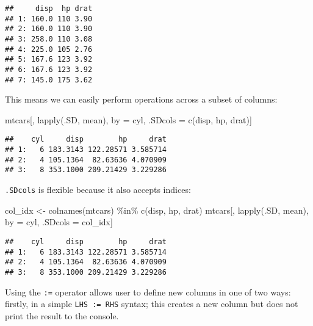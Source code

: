 \documentclass[
]{book}
\newenvironment{Shaded}{\begin{snugshade}}{\end{snugshade}}
\newcommand{\FunctionTok}[1]{\textcolor[rgb]{0.00,0.00,0.00}{#1}}
\newcommand{\NormalTok}[1]{#1}
\newcommand{\OtherTok}[1]{\textcolor[rgb]{0.56,0.35,0.01}{#1}}
\newcommand{\SpecialCharTok}[1]{\textcolor[rgb]{0.00,0.00,0.00}{#1}}
\newcommand{\StringTok}[1]{\textcolor[rgb]{0.31,0.60,0.02}{#1}}
\begin{document}
\begin{verbatim}
##     disp  hp drat
## 1: 160.0 110 3.90
## 2: 160.0 110 3.90
## 3: 258.0 110 3.08
## 4: 225.0 105 2.76
## 5: 167.6 123 3.92
## 6: 167.6 123 3.92
## 7: 145.0 175 3.62
\end{verbatim}

This means we can easily perform operations across a subset of columns:

\begin{Shaded}
\begin{Highlighting}[]
\NormalTok{mtcars[, }\FunctionTok{lapply}\NormalTok{(.SD, mean), by }\OtherTok{=}\NormalTok{ cyl, .SDcols }\OtherTok{=} \FunctionTok{c}\NormalTok{(}\StringTok{\textquotesingle{}disp\textquotesingle{}}\NormalTok{, }\StringTok{\textquotesingle{}hp\textquotesingle{}}\NormalTok{, }\StringTok{\textquotesingle{}drat\textquotesingle{}}\NormalTok{)]}
\end{Highlighting}
\end{Shaded}

\begin{verbatim}
##    cyl     disp        hp     drat
## 1:   6 183.3143 122.28571 3.585714
## 2:   4 105.1364  82.63636 4.070909
## 3:   8 353.1000 209.21429 3.229286
\end{verbatim}

\texttt{.SDcols} is flexible because it also accepts indices:

\begin{Shaded}
\begin{Highlighting}[]
\NormalTok{col\_idx }\OtherTok{\textless{}{-}} \FunctionTok{colnames}\NormalTok{(mtcars) }\SpecialCharTok{\%in\%} \FunctionTok{c}\NormalTok{(}\StringTok{\textquotesingle{}disp\textquotesingle{}}\NormalTok{, }\StringTok{\textquotesingle{}hp\textquotesingle{}}\NormalTok{, }\StringTok{\textquotesingle{}drat\textquotesingle{}}\NormalTok{)}
\NormalTok{mtcars[, }\FunctionTok{lapply}\NormalTok{(.SD, mean), by }\OtherTok{=}\NormalTok{ cyl, .SDcols }\OtherTok{=}\NormalTok{ col\_idx]}
\end{Highlighting}
\end{Shaded}

\begin{verbatim}
##    cyl     disp        hp     drat
## 1:   6 183.3143 122.28571 3.585714
## 2:   4 105.1364  82.63636 4.070909
## 3:   8 353.1000 209.21429 3.229286
\end{verbatim}

Using the \texttt{:=} operator allows user to define new columns in one of two ways: firstly, in a simple \texttt{LHS\ :=\ RHS} syntax; this creates a new column but does not print the result to the console.
\end{document}
